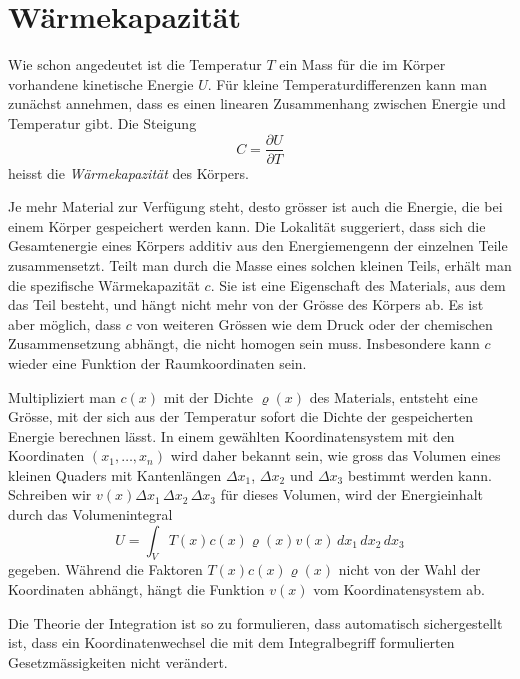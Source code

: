 %
%
%

%
%
\section{Wärmekapazität
\label{buch:fallstudie:waermekapazitaet}}
Wie schon angedeutet ist die Temperatur $T$ ein Mass für die im Körper
vorhandene kinetische Energie $U$.
Für kleine Temperaturdifferenzen kann man zunächst annehmen, dass
es einen linearen Zusammenhang zwischen Energie und Temperatur gibt.
Die Steigung 
\[
C
=
\frac{\partial U}{\partial T}
\]
heisst die {\em Wärmekapazität} des Körpers.

Je mehr Material zur Verfügung steht, desto grösser ist auch die Energie,
die bei einem Körper gespeichert werden kann.
Die Lokalität suggeriert, dass sich die Gesamtenergie eines Körpers 
additiv aus den Energiemengenn der einzelnen Teile zusammensetzt.
Teilt man durch die Masse eines solchen kleinen Teils, erhält man die
spezifische Wärmekapazität $c$.
Sie ist eine Eigenschaft des Materials, aus dem das Teil besteht,
und hängt nicht mehr von der Grösse des Körpers ab.
Es ist aber möglich, dass $c$ von weiteren Grössen wie dem Druck oder der
chemischen Zusammensetzung abhängt, die nicht homogen sein muss.
Insbesondere kann $c$ wieder eine Funktion der Raumkoordinaten sein.

Multipliziert man $c(x)$ mit der Dichte $\varrho(x)$ des Materials,
entsteht eine Grösse, mit der sich aus der Temperatur sofort die
Dichte der gespeicherten Energie berechnen lässt.
In einem gewählten Koordinatensystem mit den Koordinaten $(x_1,\dots,x_n)$
wird daher bekannt sein, wie gross das Volumen eines kleinen
Quaders mit Kantenlängen $\Delta x_1$, $\Delta x_2$ und $\Delta x_3$ 
bestimmt werden kann.
Schreiben wir $v(x) \Delta x_1\,\Delta x_2\,\Delta x_3$ für dieses 
Volumen, wird der Energieinhalt durch das Volumenintegral
\[
U
=
\int_V T(x) c(x)\varrho(x) v(x)\,dx_1\,dx_2\,dx_3
\]
gegeben.
Während die Faktoren $T(x) c(x) \varrho(x)$ nicht von der Wahl der
Koordinaten abhängt, hängt die Funktion $v(x)$ vom Koordinatensystem
ab.

\begin{aufgabe}
Die Theorie der Integration ist so zu formulieren, dass automatisch
sichergestellt ist, dass ein Koordinatenwechsel die mit dem Integralbegriff
formulierten Gesetzmässigkeiten nicht verändert.
\end{aufgabe}

